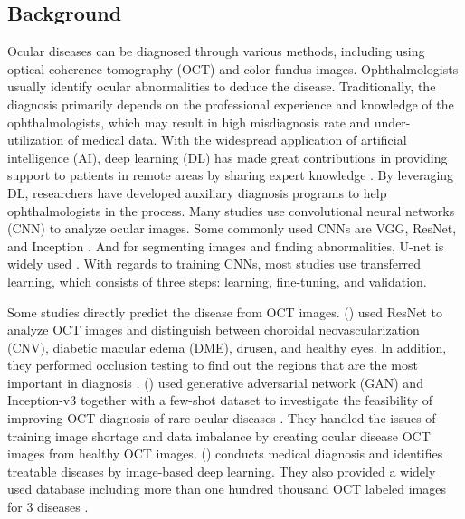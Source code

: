 \documentclass{article}
\newcommand{\authyear}[1]{\citeauthor{#1} (\citeyear{#1})}
\begin{document}
	\begin{multicols}{2}
	\section{Background}
	Ocular diseases can be diagnosed through various methods, including using optical coherence tomography (OCT) and color fundus images. Ophthalmologists usually identify ocular abnormalities to deduce the disease. Traditionally, the diagnosis primarily depends on the professional experience and knowledge of the ophthalmologists, which may result in high misdiagnosis rate and under-utilization of medical data. With the widespread application of artificial intelligence (AI), deep learning (DL) has made great contributions in providing support to patients in remote areas by sharing expert knowledge \autocite{Ichhpujani_Thakur_2021}. By leveraging DL, researchers have developed auxiliary diagnosis programs to help ophthalmologists in the process. Many studies use convolutional neural networks (CNN) to analyze ocular images. Some commonly used CNNs are VGG, ResNet, and Inception \autocite{daich2023artificial}. And for segmenting images and finding abnormalities, U-net is widely used \autocite{Ronneberger_Fischer_Brox_2015}. With regards to training CNNs, most studies use transferred learning, which consists of three steps: learning, fine-tuning, and validation.
	
	Some studies directly predict the disease from OCT images.
	\authyear{li2019deep} used ResNet to analyze OCT images and distinguish between choroidal neovascularization (CNV), diabetic macular edema (DME), drusen, and healthy eyes. In addition, they performed occlusion testing to find out the regions that are the most important in diagnosis \autocite{li2019deep}. 
	\authyear{yoo2021feasibility} used generative adversarial network (GAN) and Inception-v3 together with a few-shot dataset to investigate the feasibility of improving OCT diagnosis of rare ocular diseases \autocite{yoo2021feasibility}. They handled the issues of training image shortage and data imbalance by creating ocular disease OCT images from healthy OCT images. \authyear{Kermany2018} conducts medical diagnosis and identifies treatable diseases by image-based deep learning. They also provided a widely used database including more than one hundred thousand OCT labeled images for 3 diseases \autocite{Kermany2018}.
	

\end{multicols}
\end{document}
